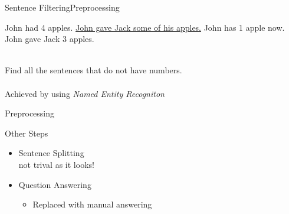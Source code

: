 \documentclass[11pt]{beamer}
\begin{document}
\begin{frame}{Sentence Filtering}{Preprocessing}
    \begin{example}
    John had 4 apples. \underline{John gave Jack some of his apples.} John has 1 apple now. John gave Jack 3 apples.
    \end{example}
    ~\\
    Find all the sentences that do not have numbers.\\
    ~\\
    Achieved by using \emph{Named Entity Recogniton}
\end{frame}

\begin{frame}{Preprocessing}
    \begin{block}{Other Steps}
    \begin{itemize}
    \item<1> Sentence Splitting\\
    not trival as it looks!
    \item<2-> Question Answering
    \begin{itemize}
        \item<2-> Replaced with manual answering
    \end{itemize}
    \end{itemize}
    \end{block}
\end{frame}
\end{document}

